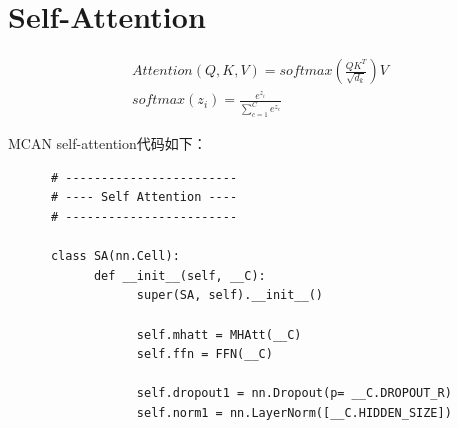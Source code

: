 \documentclass[a4paper]{article}
\begin{document}
\begin{sloppypar}




      \section{Self-Attention}

      \begin{gather}
            Attention(Q,K,V)=softmax(\frac{QK^T}{\sqrt{d_k}})V\\
            softmax(z_i)=\frac{e^{z_i}}{\sum_{c=1}^C e^{z_c}}
      \end{gather}

      MCAN self-attention代码如下：
      \begin{lstlisting}
      # ------------------------
      # ---- Self Attention ----
      # ------------------------

      class SA(nn.Cell):
            def __init__(self, __C):
                  super(SA, self).__init__()

                  self.mhatt = MHAtt(__C)
                  self.ffn = FFN(__C)

                  self.dropout1 = nn.Dropout(p= __C.DROPOUT_R)
                  self.norm1 = nn.LayerNorm([__C.HIDDEN_SIZE])


\end{lstlisting}
\end{sloppypar}
\end{document}
